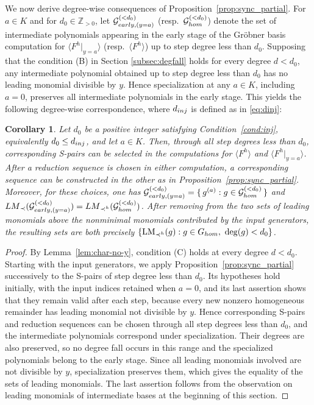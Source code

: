 \documentclass{article}
\newtheorem{corollary}[theorem]{Corollary}
\theoremstyle{definition}
\theoremstyle{plain}
\theoremstyle{plain}
\theoremstyle{plain}
\theoremstyle{plain}
\numberwithin{equation}{subsection}
\begin{document}
We now derive degree-wise consequences of Proposition~\ref{prop:sync_partial}.
For $a\in K$ and for $d_0\in\mathbb{Z}_{>0}$, let $\mathcal G_{\rm early, (y=a)}^{(<d_0)}$ (resp.\ $\mathcal G_{\rm hom}^{(<d_0)}$) denote the set of intermediate polynomials appearing in the early stage of the Gr\"{o}bner basis computation for $\langle F^h|_{y=a}\rangle$ (resp.\ $\langle F^h \rangle$) up to step degree less than $d_0$.
Supposing that the condition (B) in Section \ref{subsec:degfall} holds for every degree $d<d_0$, any intermediate polynomial obtained up to step degree less than $d_0$ has no leading monomial divisible by $y$. 
Hence specialization at any $a\in K$, including $a=0$, preserves all intermediate polynomials in the early stage.
This yields the following degree-wise correspondence, where $d_{\rm inj}$ is defined as in \eqref{eq:dinj}:

\begin{corollary}\label{cor:sync_degwise}
Let $d_0$ be a positive integer satisfying Condition~\ref{cond:inj}, equivalently $d_0\leq d_{\rm inj}$, and let $a\in K$.
Then, through all step degrees less than $d_0$, corresponding S-pairs can be selected in the computations for $\langle F^h\rangle$ and $\langle F^h|_{y=a}\rangle$.
After a reduction sequence is chosen in either computation, a corresponding sequence can be constructed in the other as in Proposition~\ref{prop:sync_partial}.
Moreover, for these choices, one has $\mathcal G^{(<d_0)}_{\rm early, (y=a)}=\{\, g^{(a)} : g\in \mathcal G_{\rm hom}^{(<d_0)} \,\}$ and ${\rm LM}_{\prec}(\mathcal G_{\rm early,(y=a)}^{(<d_0)}) ={\rm LM}_{\prec^h}(\mathcal G_{\rm hom}^{(<d_0)})$.
After removing from the two sets of leading monomials above the nonminimal monomials contributed by the input generators, the resulting sets are both precisely $\{\operatorname{LM}_{\prec^h}(g):g\in G_{\rm hom},\ \deg(g)<d_0\}$.
\end{corollary}

\begin{proof}
By Lemma~\ref{lem:char-no-y}, condition {\rm (C)} holds at every degree $d<d_0$.
Starting with the input generators, we apply Proposition~\ref{prop:sync_partial} successively to the S-pairs of step degree less than $d_0$.
Its hypotheses hold initially, with the input indices retained when $a=0$, and its last assertion shows that they remain valid after each step, because every new nonzero homogeneous remainder has leading monomial not divisible by $y$.
Hence corresponding S-pairs and reduction sequences can be chosen through all step degrees less than $d_0$, and the intermediate polynomials correspond under specialization.
Their degrees are also preserved, so no degree fall occurs in this range and the specialized polynomials belong to the early stage.
Since all leading monomials involved are not divisible by $y$, specialization preserves them, which gives the equality of the sets of leading monomials.
The last assertion follows from the observation on leading monomials of intermediate bases at the beginning of this section.
\end{proof}
\end{document}
